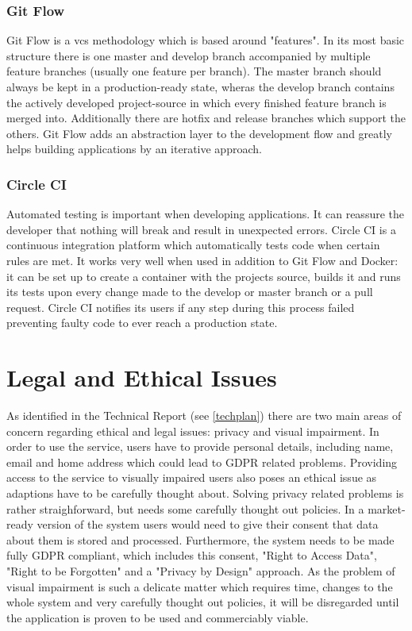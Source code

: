 \subsubsection{Git Flow}
Git Flow is a \acrshort{vcs} methodology which is based around "features". In its most basic structure there is one master and develop branch accompanied by multiple feature branches (usually one feature per branch). The master branch should always be kept in a production-ready state, wheras the develop branch contains the actively developed project-source in which every finished feature branch is merged into. Additionally there are hotfix and release branches which support the others. Git Flow adds an abstraction layer to the development flow and greatly helps building applications by an iterative approach.

\subsubsection{Circle CI}
Automated testing is important when developing applications. It can reassure the developer that nothing will break and result in unexpected errors. Circle CI is a continuous integration platform which automatically tests code when certain rules are met. It works very well when used in addition to Git Flow and Docker: it can be set up to create a container with the projects source, builds it and runs its tests upon every change made to the develop or master branch or a pull request. Circle CI notifies its users if any step during this process failed preventing faulty code to ever reach a production state.

\section{Legal and Ethical Issues}
As identified in the Technical Report (see \autoref{techplan}) there are two main areas of concern regarding ethical and legal issues: privacy and visual impairment. In order to use the service, users have to provide personal details, including name, email and home address which could lead to GDPR related problems. Providing access to the service to visually impaired users also poses an ethical issue as adaptions have to be carefully thought about. Solving privacy related problems is rather straighforward, but needs some carefully thought out policies. In a market-ready version of the system users would need to give their consent that data about them is stored and processed. Furthermore, the system needs to be made fully GDPR compliant, which includes this consent, "Right to Access Data", "Right to be Forgotten" and a "Privacy by Design" approach. As the problem of visual impairment is such a delicate matter which requires time, changes to the whole system and very carefully thought out policies, it will be disregarded until the application is proven to be used and commerciably viable.  